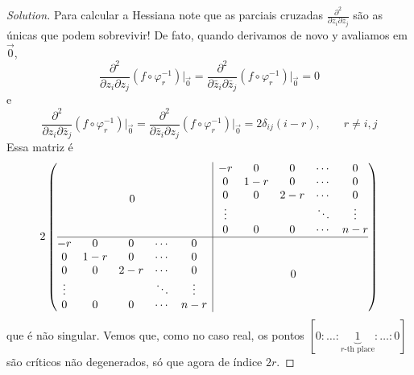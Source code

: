 \begin{proof}[Solution]
Para calcular a Hessiana note que as parciais cruzadas \(\frac{\partial^2 }{\partial z_i\partial \overline{z}_j}\) são as únicas que podem sobrevivir! De fato, quando derivamos de novo y avaliamos em \(\vec{0}\),
\[\frac{\partial^2}{\partial z_i \partial z_j }(f \circ \varphi_r^{-1})\Big|_{\vec{0}}=\frac{\partial^2 }{\partial \bar{z}_i\partial \bar{z}_j}(f \circ \varphi_r^{-1})\Big|_{\vec{0}}=0\]
e
\[\frac{\partial^2 }{\partial z_i\partial \bar{z}_j}(f \circ \varphi_r^{-1})\Big|_{\vec{0}}=\frac{\partial^2 }{\partial \bar{z}_i\partial z_j}(f \circ \varphi_r^{-1})\Big|_{\vec{0}}=2\delta_{ij}(i-r), \qquad  r\neq i,j\]
Essa matriz é
\[2\left(\begin{array}{@{}c|c@{}}
0&\begin{matrix} -r & 0 &0 & \cdots &0\\
0 & 1-r & 0& \cdots & 0\\
0 & 0 & 2-r & \cdots & 0\\
\vdots & & &\ddots &\vdots \\
0 & 0 & 0 & \cdots & n-r\end{matrix}\\
\hline
\begin{matrix} -r & 0 &0 & \cdots &0\\
0 & 1-r & 0& \cdots & 0\\
0 & 0 & 2-r & \cdots & 0\\
\vdots & & &\ddots &\vdots \\
0 & 0 & 0 & \cdots & n-r\end{matrix}&0\end{array}\right)\]
que é não singular. Vemos que, como no caso real, os pontos \([0:\ldots:\underbrace{1}_{r\text{-th place} }:\ldots:0]\) são críticos não degenerados, só que agora de índice \(2r\).
\end{proof}



